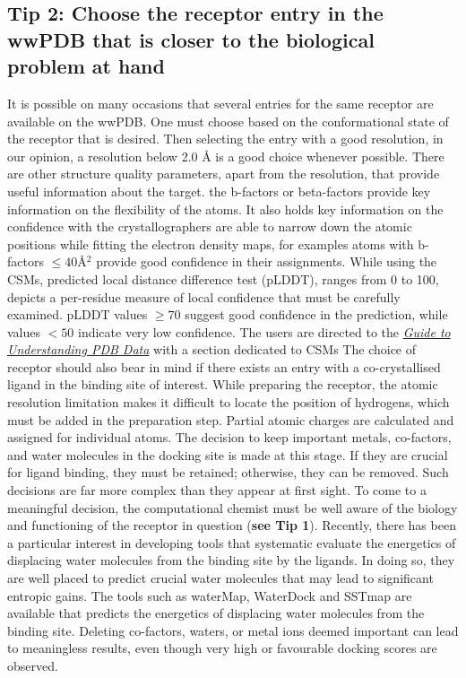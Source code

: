 \documentclass[10pt,letterpaper]{article}
\begin{document}
{{\subsection*{Tip 2: Choose the receptor entry in the wwPDB that is closer to the biological problem at hand}
It is possible on many occasions that several entries for the same receptor are available on the wwPDB. One must choose based on the conformational state of the receptor that is desired. Then selecting the entry with a good resolution, in our opinion, a resolution below 2.0 \r{A} is a good choice whenever possible. There are other structure quality parameters, apart from the resolution, that provide useful information about the target. the b-factors or beta-factors provide key information on the flexibility of the atoms. It also holds key information on the confidence with the crystallographers are able to narrow down the atomic positions while fitting the electron density maps, for examples atoms with b-factors $\le40 $\r{A}$^2$$ $ provide good confidence in their assignments. While using the CSMs, predicted local distance difference test (pLDDT), ranges from 0 to 100, depicts a per-residue measure of local confidence that must be carefully examined. pLDDT values $\ge70$ suggest good confidence in the prediction, while values $<50$ indicate very low confidence. The users are directed to the \href{https://pdb101.rcsb.org/learn/guide-to-understanding-pdb-data/computed-structure-models}{\textit{Guide to Understanding PDB Data}} with a section dedicated to CSMs  The choice of receptor should also bear in mind if there exists an entry with a co-crystallised ligand in the binding site of interest.  While preparing the receptor, the atomic resolution limitation makes it difficult to locate the position of hydrogens, which must be added in the preparation step. Partial atomic charges are calculated and assigned for individual atoms.  The decision to keep important metals, co-factors, and water molecules in the docking site is made at this stage. If they are crucial for ligand binding, they must be retained; otherwise, they can be removed. Such decisions are far more complex than they appear at first sight. To come to a meaningful decision, the computational chemist must be well aware of the biology and functioning of the receptor in question (\textbf{see  Tip 1}). Recently, there has been a particular interest in developing tools that systematic evaluate the energetics of displacing water molecules from the binding site by the ligands. In doing so, they are well placed to predict crucial water molecules that may lead to significant entropic gains. The tools such as  waterMap\cite{bib48, bib49}, WaterDock\cite{bib47} and SSTmap\cite{bib50} are available that predicts the energetics of displacing water molecules from the binding site. Deleting co-factors, waters, or metal ions deemed important can lead to meaningless results, even though very high or favourable docking scores are observed.

}}
\end{document}
